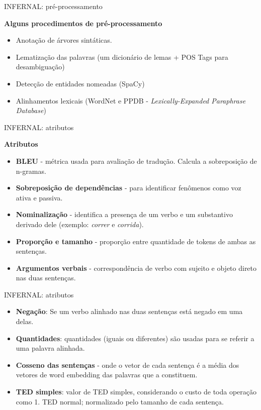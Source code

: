 \documentclass{beamer}
\begin{document}
\begin{frame}[fragile]{INFERNAL: pré-processamento}
\begin{center}
\textbf{Alguns procedimentos de pré-processamento}
\end{center}
\begin{itemize}
\item Anotação de árvores sintáticas.\\
\item Lematização das palavras (um dicionário de lemas + POS Tags para desambiguação)\\
\item Detecção de entidades nomeadas (SpaCy)		\\
\item Alinhamentos lexicais (WordNet e PPDB - \emph{Lexically-Expanded Paraphrase Database})\\
\end{itemize}
\end{frame}


\begin{frame}[fragile]{INFERNAL: atributos}
\begin{center}
\textbf{Atributos}
\end{center}
\begin{itemize}
\item \textbf{BLEU} - métrica usada para avaliação de tradução. Calcula a sobreposição de n-gramas.
\item \textbf{Sobreposição de dependências} - para identificar fenômenos como voz ativa e passiva.
\item \textbf{Nominalização} - identifica a presença de um verbo e um substantivo derivado dele (exemplo: \emph{correr} e \emph{corrida}).
\item \textbf{Proporção e tamanho} - proporção entre quantidade de tokens de ambas as sentenças.
\item \textbf{Argumentos verbais} - correspondência de verbo com sujeito e objeto direto nas duas sentenças. 
\end{itemize}
\end{frame}


\begin{frame}[fragile]{INFERNAL: atributos}
\begin{itemize}
\item \textbf{Negação}: Se um verbo alinhado nas duas sentenças está negado em uma delas.
\item \textbf{Quantidades}: quantidades (iguais ou diferentes) são usadas para se referir a uma palavra alinhada.
\item \textbf{Cosseno das sentenças} - onde o vetor de cada sentença é a média dos vetores de word embedding das palavras que a constituem.
\item \textbf{TED simples}: valor de TED simples, considerando o custo de toda operação como 1. TED normal; normalizado pelo tamanho de cada sentença. 
\end{itemize}
\end{frame}
\end{document}
